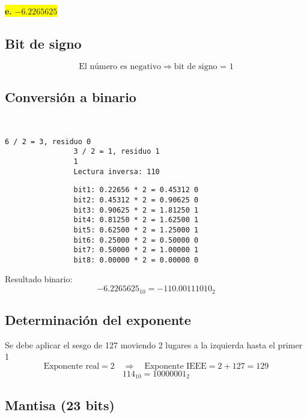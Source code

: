\documentclass[a4paper,12pt]{article}
\begin{document}
		\begin{center}	
		\colorbox{yellow}{{\textbf{e.} $-6.2265625$}}
		
		\subsection*{Bit de signo}
		
		\[
		\text{El número es negativo} \Rightarrow \text{bit de signo = } \boxed{1}
		\]
		
		\subsection*{Conversión a binario}
		
		
		~~~~~~~~~~~~~~~~~~~~~~~~~ 
		\begin{center}
			\begin{Verbatim}[formatcom=\centering]
				6 / 2 = 3, residuo 0
				3 / 2 = 1, residuo 1
				1 
				Lectura inversa: 110
			\end{Verbatim}
		\end{center}
		
		
		\begin{center}
			\begin{Verbatim}
				bit1: 0.22656 * 2 = 0.45312 0 
				bit2: 0.45312 * 2 = 0.90625 0 
				bit3: 0.90625 * 2 = 1.81250 1 
				bit4: 0.81250 * 2 = 1.62500 1 
				bit5: 0.62500 * 2 = 1.25000 1 
				bit6: 0.25000 * 2 = 0.50000 0 
				bit7: 0.50000 * 2 = 1.00000 1 
				bit8: 0.00000 * 2 = 0.00000 0 				
			\end{Verbatim}
		\end{center}
		
		Resultado binario: 
		\[
		-6.2265625_{10} = -110.00111010_2
		\]
		
		\subsection*{Determinación del exponente}
		
		Se debe aplicar el sesgo de 127 moviendo 2 lugares a la izquierda hasta el primer 1
		\vspace{-0.5em}
		\[
		\text{Exponente real} = 2 \quad \Rightarrow \quad \text{Exponente IEEE} = 2 + 127 = 129
		\]
		\vspace{-0.5em}
		\[
		114_{10} = 10000001_2
		\]
		
		\subsection*{Mantisa (23 bits)}
		

\end{center}
\end{document}

